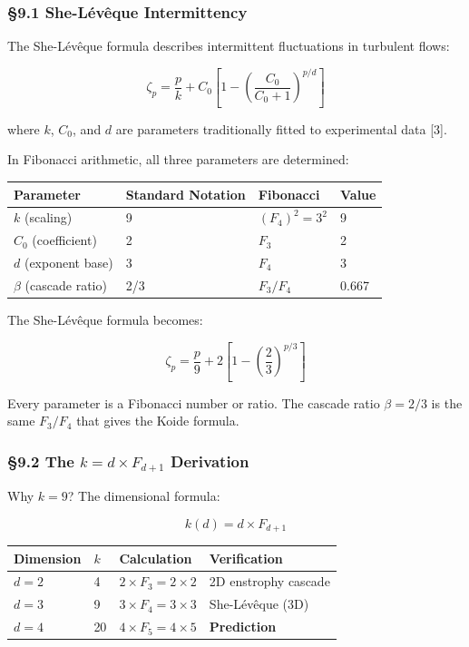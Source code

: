 \documentclass[
  11pt,
  a4paper]{article}
\begin{document}
\subsubsection{§9.1 She-Lévêque
Intermittency}\label{she-luxe9vuxeaque-intermittency}

The She-Lévêque formula describes intermittent fluctuations in turbulent
flows:

\[\zeta_p = \frac{p}{k} + C_0 \left[1 - \left(\frac{C_0}{C_0 + 1}\right)^{p/d}\right]\]

where \(k\), \(C_0\), and \(d\) are parameters traditionally fitted to
experimental data {[}3{]}.

In Fibonacci arithmetic, all three parameters are determined:

\begin{longtable}[]{@{}llll@{}}
\toprule\noalign{}
Parameter & Standard Notation & Fibonacci & Value \\
\midrule\noalign{}
\endhead
\bottomrule\noalign{}
\endlastfoot
\(k\) (scaling) & 9 & \((F_4)^2 = 3^2\) & 9 \\
\(C_0\) (coefficient) & 2 & \(F_3\) & 2 \\
\(d\) (exponent base) & 3 & \(F_4\) & 3 \\
\(\beta\) (cascade ratio) & 2/3 & \(F_3/F_4\) & 0.667 \\
\end{longtable}

The She-Lévêque formula becomes:

\[\zeta_p = \frac{p}{9} + 2\left[1 - \left(\frac{2}{3}\right)^{p/3}\right]\]

Every parameter is a Fibonacci number or ratio. The cascade ratio
\(\beta = 2/3\) is the same \(F_3/F_4\) that gives the Koide formula.

\subsubsection{\texorpdfstring{§9.2 The \(k = d \times F_{d+1}\)
Derivation}{§9.2 The k = d \textbackslash times F\_\{d+1\} Derivation}}\label{the-k-d-times-f_d1-derivation}

Why \(k = 9\)? The dimensional formula:

\[k(d) = d \times F_{d+1}\]

\begin{longtable}[]{@{}llll@{}}
\toprule\noalign{}
Dimension & \(k\) & Calculation & Verification \\
\midrule\noalign{}
\endhead
\bottomrule\noalign{}
\endlastfoot
\(d = 2\) & 4 & \(2 \times F_3 = 2 \times 2\) & 2D enstrophy cascade \\
\(d = 3\) & 9 & \(3 \times F_4 = 3 \times 3\) & She-Lévêque (3D) \\
\(d = 4\) & 20 & \(4 \times F_5 = 4 \times 5\) & \textbf{Prediction} \\
\end{longtable}
\end{document}
